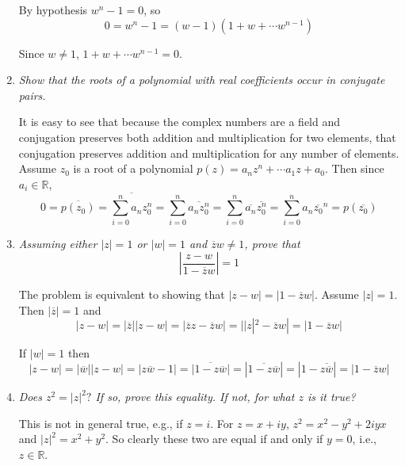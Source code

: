 \documentclass[letterpaper, 11pt]{article}
\begin{document}
\begin{enumerate}
By hypothesis $w^n -1 = 0$, so
\[
0 = w^n - 1 = (w-1)(1+w+\cdots w^{n-1})
\]

Since $w \neq 1$, $1+w+\cdots w^{n-1} = 0$.

\item \emph{Show that the roots of a polynomial with real coefficients occur in conjugate pairs.}

It is easy to see that because the complex numbers are a field and conjugation preserves both addition and multiplication for two elements, that conjugation preserves addition and multiplication for any number of elements.  Assume $z_0$ is a root of a polynomial $p(z) = a_nz^n + \cdots a_1z + a_0$.  Then since $a_i \in \mathbb{R}$, 
\[
0 = \overline{p(z_0)} = \overline{\sum_{i=0}^n a_nz_0^n} = \sum_{i=0}^n \overline{a_nz_0^n} = \sum_{i=0}^n \overline{a_n}\overline{z_0^n} = \sum_{i=0}^n a_n\overline{z_0}^n = p(\overline{z_0})
\]

\item \emph{Assuming either $|z|=1$ or $|w| = 1$ and $\overline{z}w \neq 1$, prove that $$\left|\frac{z-w}{1-\overline{z}w}\right| = 1$$}

The problem is equivalent to showing that $|z-w| = |1-\overline{z}w|$.  Assume $|z| = 1$.  Then $|\overline{z}| = 1$ and
\[
|z-w| = |\overline{z}||z-w| = |\overline{z}z - \overline{z}w| = ||z|^2 - \overline{z}w| = |1 - \overline{z}w|
\]

If $|w| = 1$ then
\[
|z-w| = |\overline{w}||z-w| = |z\overline{w} - 1| = \overline{|1 - z\overline{w}|} = |\overline{1 - z\overline{w}}| = |1 - \overline{z\overline{w}}| = |1 - \overline{z}w|
\]

\item \emph{Does $z^2 = |z|^2?$  If so, prove this equality.  If not, for what $z$ is it true?}

This is not in general true, e.g., if $z = i$.  For $z=x+iy$, $z^2 = x^2 - y^2 + 2iyx$ and $|z|^2 = x^2 + y^2$.  So clearly these two are equal if and only if $y=0$, i.e., $z \in \mathbb{R}$.
\end{enumerate} 
\end{document}
